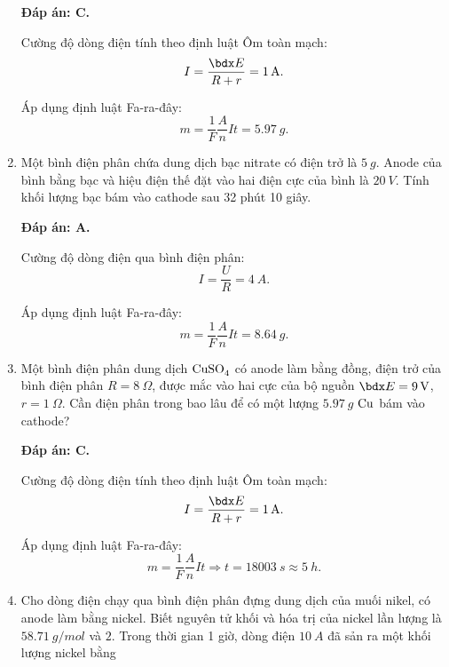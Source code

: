 \begin{enumerate}[label=\bfseries Câu \arabic*:]
{	}
	\loigiai
	{	\textbf{Đáp án: C.}
		
		Cường độ dòng điện tính theo định luật Ôm toàn mạch:
		$$I=\dfrac{\calE}{R + r} = \SI{1}{A}.$$
		
		Áp dụng định luật Fa-ra-đây:
		$$m=\dfrac{1}{F} \dfrac{A}{n} I t = \SI{5.97}{g}.$$
	}
	\item {}
	
	\cauhoi
	{Một bình điện phân chứa dung dịch bạc nitrate có điện trở là $\SI{5}{g}$. Anode của bình bằng bạc và hiệu điện thế đặt vào hai điện cực của bình là $\SI{20}{V}$. Tính khối lượng bạc bám vào cathode sau 32 phút 10 giây.
		
	}
	\loigiai
	{	\textbf{Đáp án: A.}
		
		Cường độ dòng điện qua bình điện phân:
		$$I=\dfrac{U}{R} = \SI{4}{A}.$$
		
		Áp dụng định luật Fa-ra-đây:
		$$m=\dfrac{1}{F} \dfrac{A}{n} I t = \SI{8.64}{g}.$$
	}
	\item {}
	
	\cauhoi
	{Một bình điện phân dung dịch $\ce{CuSO_4}$ có anode làm bằng đồng, điện trở của bình điện phân $R=\SI{8}{\Omega}$, được mắc vào hai cực của bộ nguồn $\calE = \SI{9}{V}$, $r=\SI{1}{\Omega}$. Cần điện phân trong bao lâu để có một lượng $\SI{5.97}{g}$ $\ce{Cu}$ bám vào cathode?
		
	}
	\loigiai
	{	\textbf{Đáp án: C.}
		
		Cường độ dòng điện tính theo định luật Ôm toàn mạch:
		$$I=\dfrac{\calE}{R + r} = \SI{1}{A}.$$
		
		Áp dụng định luật Fa-ra-đây:
		$$m=\dfrac{1}{F} \dfrac{A}{n} I t \Rightarrow t = \SI{18003}{s} \approx \SI{5}{h}.$$
	}
	\item {}
	
	\cauhoi
	{Cho dòng điện chạy qua bình điện phân đựng dung dịch của muối nikel, có anode làm bằng nickel. Biết nguyên tử khối và hóa trị của nickel lần lượng là $\SI{58.71}{g/mol}$ và $2$. Trong thời gian 1 giờ, dòng điện $\SI{10}{A}$ đã sản ra một khối lượng nickel bằng
		
}
\end{enumerate}
